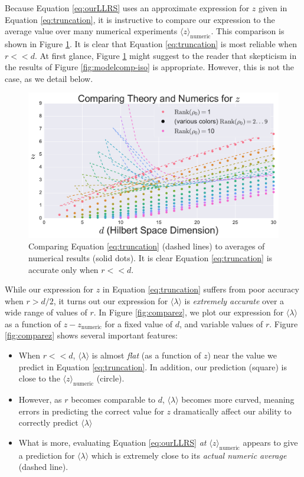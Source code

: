 \documentclass[aps,pra, twocolumn]{revtex4-1}
\begin{document}
Because Equation \eqref{eq:ourLLRS} uses an approximate expression for $z$ given in Equation \eqref{eq:truncation}, it is instructive to compare our expression to the average value over many  numerical experiments $\langle z \rangle_{\mathrm{numeric}}$. This comparison is shown in Figure \ref{fig:modelcomp-iso-z}. It is clear that Equation \eqref{eq:truncation} is most reliable when $r << d$. At first glance, Figure \ref{fig:modelcomp-iso-z} might suggest to the reader that skepticism in the results of Figure \ref{fig:modelcomp-iso} is appropriate. However, this is not the case, as we detail below.


\begin{figure}[h]
 \includegraphics[width=\columnwidth]{Images/Figure_temp2.pdf}
 \caption{Comparing Equation \eqref{eq:truncation} (dashed lines) to averages of numerical results (solid dots). It is clear Equation \eqref{eq:truncation} is accurate only when $r << d$.}
 \label{fig:modelcomp-iso-z}
\end{figure}

While our expression for $z$ in Equation \eqref{eq:truncation} suffers from poor accuracy when $r > d/2$, it turns out our expression for $\langle \lambda \rangle$ is \emph{extremely accurate} over a wide range of values of $r$. In Figure \ref{fig:comparez}, we plot our expression for $\langle \lambda \rangle$ as a function of $z - z_{\mathrm{numeric}}$ for a fixed value of $d$, and variable values of $r$. Figure \ref{fig:comparez} shows several important features:
\begin{itemize}[nosep]
\item When $r << d$, $\langle \lambda \rangle$ is almost \emph{flat} (as a function of $z$) near the value we predict in Equation \eqref{eq:truncation}. In addition, our prediction (square) is close to the $\langle z \rangle_{\mathrm{numeric}}$ (circle).
\item However, as $r$ becomes comparable to $d$, $\langle \lambda \rangle$ becomes more curved, meaning errors in predicting the correct value for $z$ dramatically affect our ability to correctly predict $\langle \lambda \rangle$
\item What is more, evaluating Equation \eqref{eq:ourLLRS} \emph{at} $\langle z \rangle_{\mathrm{numeric}}$ appears to give a prediction for $\langle \lambda \rangle$ which is extremely close to its \emph{actual numeric average} (dashed line).
\end{itemize}
\end{document}
